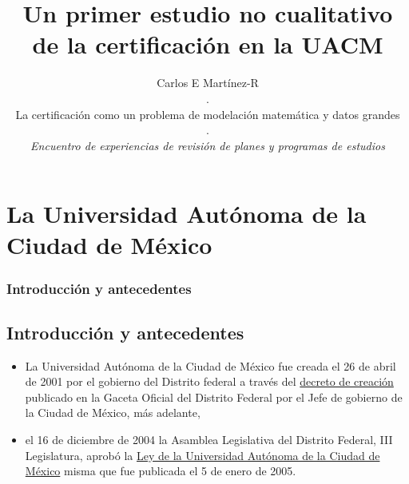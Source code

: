 \documentclass[xcolor=dvipsnames]{beamer}
\title{Un primer estudio no cualitativo de la certificaci\'on en la UACM}
\author{Carlos E Mart\'inez-R\\
.\\
\tiny{La certificaci\'on como un problema de modelaci\'on
matem\'atica y datos grandes}\\
.\\
\tiny{\textit{Encuentro de experiencias de revisi\'on de planes y programas de estudios}}
}
\begin{document}
\begin{frame}
  \maketitle

\end{frame}


\section*{}
\small
\begin{frame}
\tableofcontents
\end{frame}
%


\section{La Universidad Aut\'onoma de la Ciudad de M\'exico}


\begin{frame}\frametitle{Introducci\'on y antecedentes}



\subsection{Introducci\'on y antecedentes}

\begin{itemize}

\item La Universidad Aut\'onoma de la Ciudad de M\'exico fue creada el 26 de abril de 2001 por el gobierno del Distrito federal a trav\'es del \href{https://www.uacm.edu.mx/Portals/0/adam/Content/hfXbhKHHXE2k2Y8j2fG9UQ/Text/DCUACM.pdf}{decreto de creaci\'on} publicado en la Gaceta Oficial del Distrito Federal por el Jefe de gobierno de la Ciudad de M\'exico, m\'as adelante, 

\item el 16 de diciembre de 2004 la Asamblea Legislativa del Distrito Federal, III Legislatura, aprob\'o la \href{https://www.uacm.edu.mx/Portals/0/ley_uacm092011.pdf}{Ley de la Universidad Aut\'onoma de la Ciudad de M\'exico} misma que fue publicada el 5 de enero de 2005.

\end{itemize}
\end{frame}
\end{document}
